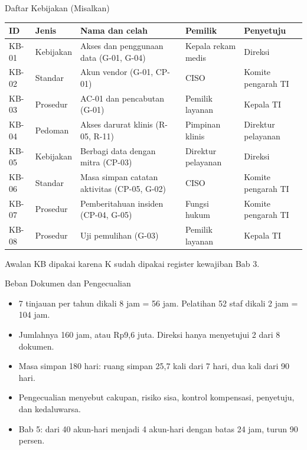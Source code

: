 \documentclass[aspectratio=169, table, 12pt]{beamer}
\begin{document}
\begin{frame}{{\Large Daftar Kebijakan (Misalkan)}}
  \vspace{2pt}
  \scriptsize
  \begin{tabularx}{\textwidth}{|>{\raggedright\arraybackslash}p{}|>{\raggedright\arraybackslash}p{}|>{\raggedright\arraybackslash}X|>{\raggedright\arraybackslash}p{}|>{\raggedright\arraybackslash}p{}|}
    \hline
    \textbf{ID} & \textbf{Jenis} & \textbf{Nama dan celah} & \textbf{Pemilik} &
    \textbf{Penyetuju} \\ \hline
    KB-01 & Kebijakan & Akses dan penggunaan data (G-01, G-04) & Kepala rekam medis & Direksi \\
    \hline
    KB-02 & Standar & Akun vendor (G-01, CP-01) & CISO & Komite pengarah TI \\ \hline
    KB-03 & Prosedur & AC-01 dan pencabutan (G-01) & Pemilik layanan & Kepala TI \\ \hline
    KB-04 & Pedoman & Akses darurat klinis (R-05, R-11) & Pimpinan klinis & Direktur pelayanan \\
    \hline
    KB-05 & Kebijakan & Berbagi data dengan mitra (CP-03) & Direktur pelayanan & Direksi \\ \hline
    KB-06 & Standar & Masa simpan catatan aktivitas (CP-05, G-02) & CISO & Komite pengarah TI \\
    \hline
    KB-07 & Prosedur & Pemberitahuan insiden (CP-04, G-05) & Fungsi hukum & Komite pengarah TI \\
    \hline
    KB-08 & Prosedur & Uji pemulihan (G-03) & Pemilik layanan & Kepala TI \\ \hline
  \end{tabularx}

  \vspace{3pt}
  Awalan KB dipakai karena K sudah dipakai register kewajiban Bab 3.
\end{frame}

\begin{frame}{{\Large Beban Dokumen dan Pengecualian}}
  \vspace{6pt}
  \small
  \begin{itemize}
    \item 7 tinjauan per tahun dikali 8 jam = 56 jam. Pelatihan 52 staf dikali 2 jam = 104 jam.
    \item Jumlahnya 160 jam, atau Rp9,6 juta. Direksi hanya menyetujui 2 dari 8 dokumen.
    \item Masa simpan 180 hari: ruang simpan 25,7 kali dari 7 hari, dua kali dari 90 hari.
    \item Pengecualian menyebut cakupan, risiko sisa, kontrol kompensasi, penyetuju, dan
          kedaluwarsa.
    \item Bab 5: dari 40 akun-hari menjadi 4 akun-hari dengan batas 24 jam, turun 90 persen.
  \end{itemize}
\end{frame}
\end{document}
